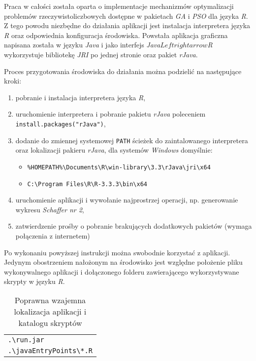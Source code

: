 \par
Praca w całości została oparta o implementacje mechanizmów optymalizacji problemów rzeczywistoliczbowych dostępne w pakietach \emph{GA} i \emph{PSO} dla języka \emph{R}. Z tego powodu niezbędne do działania aplikacji jest instalacja interpretera języka \emph{R} oraz odpowiednia konfiguracja środowiska. Powstała aplikacja graficzna napisana została w języku \emph{Java} i jako interfejs \emph{Java}$Leftrightarrow$\emph{R} wykorzystuje bibliotekę \emph{JRI} po jednej stronie oraz pakiet \emph{rJava}.

\par
Proces przygotowania środowiska do działania można podzielić na następujące kroki:
\begin{enumerate}
\item pobranie i instalacja interpretera języka \emph{R},
\item uruchomienie interpretera i pobranie pakietu \emph{rJava} poleceniem \lstinline{install.packages("rJava")},
\item dodanie do zmiennej systemowej \lstinline{PATH} ścieżek do zaintalowanego interpretera oraz lokalizacji pakieru \emph{rJava}, dla systemów \emph{Windows} domyślnie:
\begin{itemize}
\item \lstinline{%HOMEPATH%\Documents\R\win-library\3.3\rJava\jri\x64}
\item \lstinline{C:\Program Files\R\R-3.3.3\bin\x64}
\end{itemize}
\item uruchomienie aplikacji i wywołanie najprostrzej operacji, np. generowanie wykresu \emph{Schaffer nr 2},
\item zatwierdzenie prośby o pobranie brakujących dodatkowych pakietów (wymaga połączenia z internetem)
\end{enumerate}
Po wykonaniu powyższej instrukcji można swobodnie korzystać z aplikacji. Jedynym obostrzeniem nałożonym na środowisko jest względne położenie pliku wykonywalnego aplikacji i dołączonego folderu zawierającego wykorzystywane skrypty w języku \emph{R}. 


\begin{table}[ht]
\caption{Poprawna wzajemna lokalizacja aplikacji i katalogu skryptów}
\label{table:app01-lokalizacja}
\begin{center}
\begin{tabular}{|l|}
	\hline
	{\lstinline[]$.\run.jar$} \\
	{\lstinline[]$.\javaEntryPoints\*.R$} \\
	\hline
	\end{tabular}
\end{center}
\end{table}





